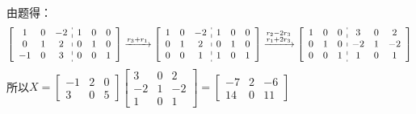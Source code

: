 \documentclass{article}
\begin{document}
\begin{jie}
由题得：
\begin{align*}
\left[
\begin{array}{c:c}
\begin{matrix}
 1 & 0 & -2 \\
  0 & 1 & 2 \\
  -1 & 0 & 3
\end{matrix} &
\begin{matrix}
  1 & 0 & 0\\
  0 & 1 & 0\\
  0 & 0 & 1
\end{matrix}
\end{array}
\right]\xrightarrow{\substack{r_{3}+r_{1}}}
{\left[
\begin{array}{c:c}
\begin{matrix}
 1 & 0 & -2 \\
  0 & 1 & 2 \\
  0 & 0 & 1
\end{matrix} &
\begin{matrix}
  1 & 0 & 0\\
  0 & 1 & 0\\
  1 & 0 & 1
\end{matrix}
\end{array}
\right]
}\xrightarrow{\substack{r_{2}-2r_{3}\\ r_{1}+2r_{3}}}
{\left[
\begin{array}{c:c}
\begin{matrix}
 1 & 0 & 0 \\
  0 & 1 & 0 \\
  0 & 0 & 1
\end{matrix} &
\begin{matrix}
  3 & 0 & 2\\
  -2 & 1 & -2\\
  1 & 0 & 1
\end{matrix}
\end{array}
\right]
}
\end{align*}
所以$X=\begin{bmatrix}
  -1 & 2 & 0 \\
  3 & 0 & 5
\end{bmatrix}\begin{bmatrix}
  3 & 0 & 2\\
  -2 & 1 & -2\\
  1 & 0 & 1
\end{bmatrix}=\begin{bmatrix}
  -7 & 2 & -6 \\
  14 & 0 & 11
\end{bmatrix}$
\end{jie}
\end{document}
